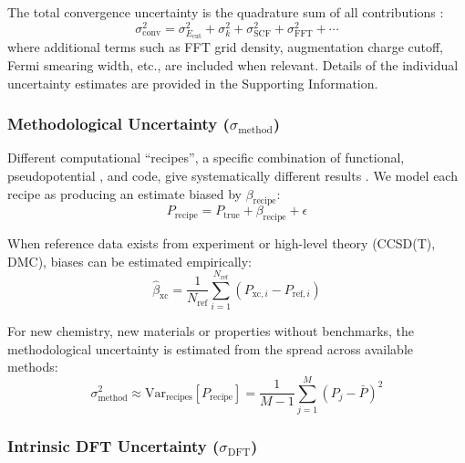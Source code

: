 \documentclass[twocolumn,superscriptaddress,amsmath,amssymb,longbibliography]{revtex4-2}
\newcommand{\Ecut}{E_{\mathrm{cut}}}
\newcommand{\xc}{\mathrm{xc}}
\newcommand{\conv}{\mathrm{conv}}
\newcommand{\meth}{\mathrm{method}}
\begin{document}
The total convergence uncertainty is the quadrature sum of all
contributions \cite{JCGM2008_GUM}:
\begin{equation}
    \sigma_\conv^2 = \sigma_{\Ecut}^2 + \sigma_k^2 + \sigma_{\mathrm{SCF}}^2
    + \sigma_{\mathrm{FFT}}^2 + \cdots
    \label{eq:total_convergence}
\end{equation}
where additional terms such as FFT grid density, augmentation charge cutoff, Fermi
smearing width, etc., are included when relevant. Details of the individual uncertainty estimates are provided in the Supporting  Information.

\subsubsection{Methodological Uncertainty ($\sigma_\meth$)}

Different computational ``recipes'', a specific combination of functional,
pseudopotential \cite{Blochl1994_PAW,Garrity2014_GBRV}, and code, give
systematically different results \cite{Lejaeghere2014}. We model
each recipe as producing an estimate biased by $\beta_{\mathrm{recipe}}$:
\begin{equation}
    P_{\mathrm{recipe}} = P_{\mathrm{true}} + \beta_{\mathrm{recipe}} + \epsilon
    \label{eq:recipe_bias}
\end{equation}

When reference data exists from experiment or high-level theory (CCSD(T), DMC),
biases can be estimated empirically:
\begin{equation}
    \hat{\beta}_{\xc} = \frac{1}{N_{\mathrm{ref}}} \sum_{i=1}^{N_{\mathrm{ref}}}
    \left( P_{\xc,i} - P_{\mathrm{ref},i} \right)
    \label{eq:bias_estimate}
\end{equation}

For new chemistry, new materials or properties without benchmarks, the methodological
uncertainty is estimated from the spread across available methods:
\begin{equation}
    \sigma_\meth^2 \approx \mathrm{Var}_{\mathrm{recipes}}[P_{\mathrm{recipe}}]
    = \frac{1}{M-1} \sum_{j=1}^{M} (P_j - \bar{P})^2
    \label{eq:method_spread}
\end{equation}

\subsubsection{Intrinsic DFT Uncertainty ($\sigma_{\mathrm{DFT}}$)}
\end{document}
